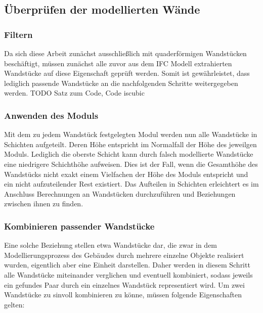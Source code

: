 \subsection{Überprüfen der modellierten Wände}
\subsubsection{Filtern}
Da sich diese Arbeit zunächst ausschließlich mit quaderförmigen Wandstücken beschäftigt, müssen zunächst alle zuvor aus dem IFC Modell extrahierten Wandstücke auf diese Eigenschaft geprüft werden.
Somit ist gewährleistet, dass lediglich passende Wandstücke an die nachfolgenden Schritte weitergegeben werden.
TODO Satz zum Code, Code iscubic

\subsubsection{Anwenden des Moduls}
Mit dem zu jedem Wandstück festgelegten Modul werden nun alle Wandstücke in Schichten aufgeteilt.
Deren Höhe entspricht im Normalfall der Höhe des jeweilgen Moduls.
Lediglich die oberste Schicht kann durch falsch modellierte Wandstücke eine niedrigere Schichthöhe aufweisen.
Dies ist der Fall, wenn die Gesamthöhe des Wandstücks nicht exakt einem Vielfachen der Höhe des Moduls entspricht und ein nicht aufzuteilender Rest existiert.
Das Aufteilen in Schichten erleichtert es im Anschluss Berechnungen an Wandstücken durchzuführen und Beziehungen zwischen ihnen zu finden.

\subsubsection{Kombinieren passender Wandstücke}
Eine solche Beziehung stellen etwa Wandstücke dar, die zwar in dem Modellierungsprozess des Gebäudes durch mehrere einzelne Objekte realisiert wurden, eigentlich aber eine Einheit darstellen.
Daher werden in diesem Schritt alle Wandstücke miteinander verglichen und eventuell kombiniert, sodass jeweils ein gefundes Paar durch ein einzelnes Wandstück representiert wird.
Um zwei Wandstücke zu sinvoll kombinieren zu könne, müssen folgende Eigenschaften gelten:

